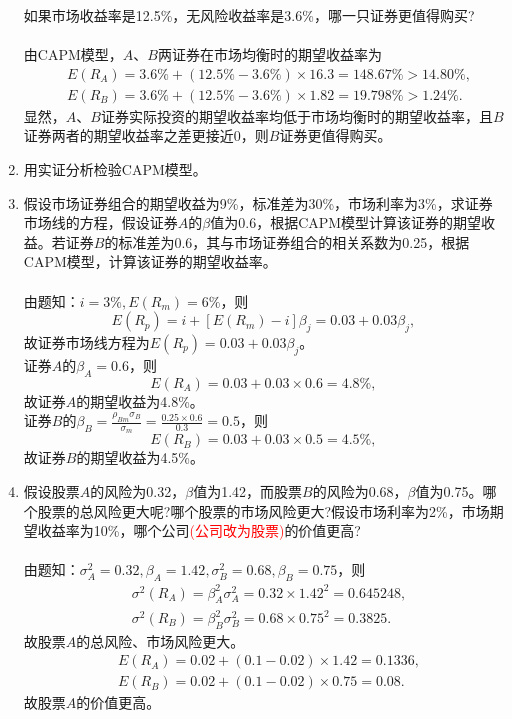 \begin{enumerate}
\begin{center}
    \end{center}
    如果市场收益率是12.5\%，无风险收益率是3.6\%，哪一只证券更值得购买?\\
    \sol\\
    由CAPM模型，$A$、$B$两证券在市场均衡时的期望收益率为
    \begin{align*}
        & E(R_A) = 3.6\% + (12.5\% - 3.6\%) \times 16.3 = 148.67\% > 14.80 \%, \\
        & E(R_B) = 3.6\% + (12.5\% - 3.6\%) \times 1.82 = 19.798\% > 1.24 \%.
    \end{align*}
    显然，$A$、$B$证券实际投资的期望收益率均低于市场均衡时的期望收益率，且$B$证券两者的期望收益率之差更接近0，则$B$证券更值得购买。
    \item 用实证分析检验CAPM模型。\\
    \omitted
    \item 假设市场证券组合的期望收益为9\%，标准差为30\%，市场利率为3\%，求证券市场线的方程，假设证券$A$的$\beta$值为0.6，根据CAPM模型计算该证券的期望收益。若证券$B$的标准差为0.6，其与市场证券组合的相关系数为0.25，根据CAPM模型，计算该证券的期望收益率。\\
    \sol\\
    由题知：$i = 3\%, E(R_m) = 6\%$，则
    \[E(R_p) = i + [E(R_m) - i]\beta_j = 0.03 + 0.03\beta_j,\]
    故证券市场线方程为$E(R_p) = 0.03 + 0.03\beta_j$。\\
    证券$A$的$\beta_A = 0.6$，则
    \[E(R_A) = 0.03 + 0.03 \times 0.6 = 4.8\%,\]
    故证券$A$的期望收益为4.8\%。\\
    证券$B$的$\displaystyle\beta_B = \frac{\rho_{Bm}\sigma_B}{\sigma_m}=\frac{0.25 \times 0.6}{0.3}=0.5$，则
    \[E(R_B) = 0.03 + 0.03 \times 0.5 = 4.5\%,\]
    故证券$B$的期望收益为4.5\%。
    \item 假设股票$A$的风险为0.32，$\beta$值为1.42，而股票$B$的风险为0.68，$\beta$值为0.75。哪个股票的总风险更大呢?哪个股票的市场风险更大?假设市场利率为2\%，市场期望收益率为10\%，哪个公司\textcolor{red}{(公司改为股票)}的价值更高?\\
    \sol\\
    由题知：$\sigma_A^2 = 0.32, \beta_A = 1.42, \sigma_B^2 = 0.68, \beta_B = 0.75$，则
    \begin{align*}
        & \sigma^2(R_A) = \beta_A^2 \sigma_A^2 = 0.32 \times 1.42^2 = 0.645248,\\
        & \sigma^2(R_B) = \beta_B^2 \sigma_B^2 = 0.68 \times 0.75^2 = 0.3825.
    \end{align*}
    故股票$A$的总风险、市场风险更大。
    \begin{align*}
        & E(R_A) = 0.02 + (0.1 - 0.02) \times 1.42 = 0.1336,\\
        & E(R_B) = 0.02 + (0.1 - 0.02) \times 0.75 = 0.08.
    \end{align*}
    故股票$A$的价值更高。
\end{enumerate}
\clearpage